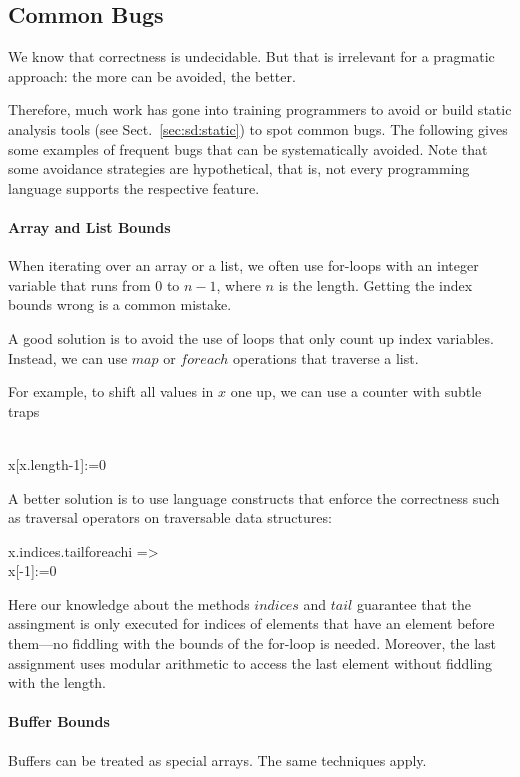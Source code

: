 \subsection{Common Bugs}\label{sec:sd:commonbugs}

We know that correctness is undecidable.
But that is irrelevant for a pragmatic approach: the more can be avoided, the better.

Therefore, much work has gone into training programmers to avoid or build static analysis tools (see Sect.~\ref{sec:sd:static}) to spot common bugs.
The following gives some examples of frequent bugs that can be systematically avoided.
Note that some avoidance strategies are hypothetical, that is, not every programming language supports the respective feature.

\paragraph{Array and List Bounds}
When iterating over an array or a list, we often use for-loops with an integer variable that runs from $0$ to $n-1$, where $n$ is the length.
Getting the index bounds wrong is a common mistake.

A good solution is to avoid the use of loops that only count up index variables.
Instead, we can use $map$ or $foreach$ operations that traverse a list.

For example, to shift all values in $x$ one up, we can use a counter with subtle traps 
\begin{acode}
\\
x[x.length-1]:=0
\end{acode}

A better solution is to use language constructs that enforce the correctness such as traversal operators on traversable data structures:
\begin{acode}
x.indices.tail\;foreach\;i =>\\
x[-1]:=0
\end{acode}
Here our knowledge about the methods $indices$ and $tail$ guarantee that the assingment is only executed for indices of elements that have an element before them---no fiddling with the bounds of the for-loop is needed.
Moreover, the last assignment uses modular arithmetic to access the last element without fiddling with the length.

\paragraph{Buffer Bounds}
Buffers can be treated as special arrays.
The same techniques apply.

